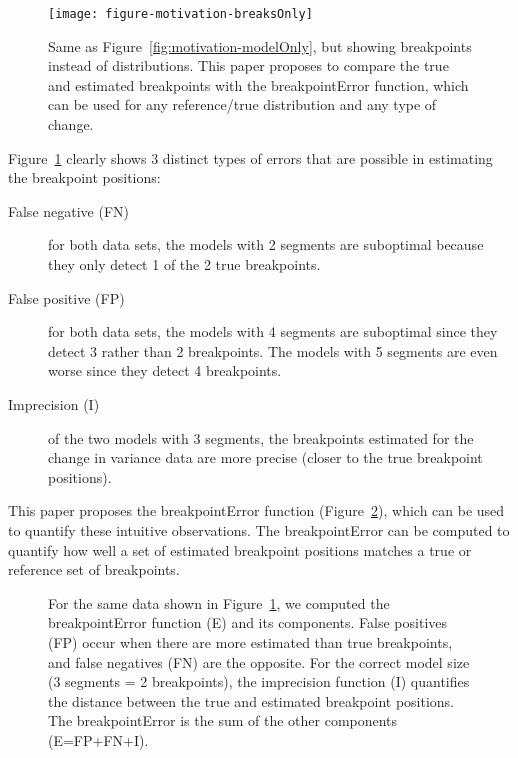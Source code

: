 \documentclass{article}
\begin{document}
\begin{figure}[H]
  \centering
  \texttt{[image: figure-motivation-breaksOnly]}
  \vskip -0.5cm
  \caption{Same as Figure~\ref{fig:motivation-modelOnly}, but showing
    breakpoints instead of distributions. This paper proposes to
    compare the true and estimated breakpoints with the
    breakpointError function, which can be used for any reference/true
    distribution and any type of change. }
  \label{fig:motivation-breaksOnly}
\end{figure}

\newpage

Figure~\ref{fig:motivation-breaksOnly} clearly shows 3 distinct types
of errors that are possible in estimating the breakpoint positions:
\begin{description}
\item[False negative (FN)] for both data sets, the models with 2
segments are suboptimal because they only detect 1 of the 2 true
breakpoints.
\item[False positive (FP)] for both data sets, the models with 4
  segments are suboptimal since they detect 3 rather than 2
  breakpoints. The models with 5 segments are even worse since they
  detect 4 breakpoints.
\item[Imprecision (I)] of the two models with 3 segments, the
  breakpoints estimated for the change in variance data are more
  precise (closer to the true breakpoint positions).
\end{description}

This paper proposes the breakpointError function
(Figure~\ref{fig:motivation-breakpointError}), which can be used to
quantify these intuitive observations. The breakpointError can be
computed to quantify how well a set of estimated breakpoint positions
matches a true or reference set of breakpoints.


\begin{figure}[H]
  \centering
  
  \vskip -0.7cm
  \caption{For the same data shown in
    Figure~\ref{fig:motivation-breaksOnly}, we computed the
    breakpointError function (E) and its components. False positives
    (FP) occur when there are more estimated than true breakpoints,
    and false negatives (FN) are the opposite. For the correct model
    size (3 segments = 2 breakpoints), the imprecision function (I)
    quantifies the distance between the true and estimated breakpoint
    positions. The breakpointError is the sum of the other components
    (E=FP+FN+I).}
  \label{fig:motivation-breakpointError}
\end{figure}
\end{document}
